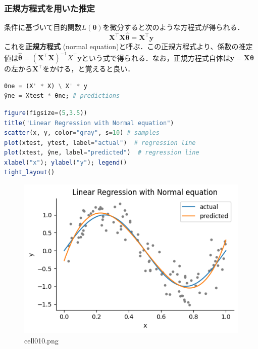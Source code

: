 \subsubsection{正規方程式を用いた推定}
条件に基づいて目的関数$L(\mathbf{\theta})$を微分すると次のような方程式が得られる．
\begin{equation}
\mathbf{X}^\top\mathbf{X}\mathbf{\hat\theta}=\mathbf{X}^\top\mathbf{y}
\end{equation}
これを\textbf{正規方程式} (normal equation)と呼ぶ．この正規方程式より、係数の推定値は$\mathbf{\hat\theta}={(\mathbf{X}^\top\mathbf{X})}^{-1}X^\top\mathbf{y}$という式で得られる．なお，正規方程式自体は$\mathbf{y}=\mathbf{X}\mathbf{\theta}$の左から$\mathbf{X}^\top$をかける，と覚えると良い．
\begin{lstlisting}[language=julia]
θne = (X' * X) \ X' * y
ŷne = Xtest * θne; # predictions
\end{lstlisting}
\begin{lstlisting}[language=julia]
figure(figsize=(5,3.5))
title("Linear Regression with Normal equation")
scatter(x, y, color="gray", s=10) # samples
plot(xtest, ytest, label="actual")  # regression line
plot(xtest, ŷne, label="predicted")  # regression line
xlabel("x"); ylabel("y"); legend()
tight_layout()
\end{lstlisting}
\begin{figure}[ht]
	\centering
	\includegraphics[scale=0.8, max width=\linewidth]{./fig/introduction/linear-regression/cell010.png}
	\caption{cell010.png}
	\label{cell010.png}
\end{figure}
